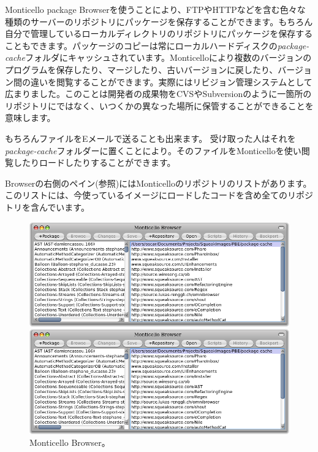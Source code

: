 \documentclass[a4paper,10pt,twoside]{book}
\begin{document}
Monticello package Browserを使うことにより、FTPやHTTPなどを含む色々な種類のサーバーのリポジトリにパッケージを保存することができます。もちろん自分で管理しているローカルディレクトリのリポジトリにパッケージを保存することもできます。パッケージのコピーは常にローカルハードディスクの\emph{package-cache}フォルダにキャッシュされています。Monticelloにより複数のバージョンのプログラムを保存したり、マージしたり、古いバージョンに戻したり、バージョン間の違いを閲覧することができます。実際にはリビジョン管理システムとして広まりました。このことは開発者の成果物をCVSやSubversionのように一箇所のリポジトリにではなく、いつくかの異なった場所に保管することができることを意味します。

もちろんファイルをEメールで送ることも出来ます。
受け取った人はそれを\emph{package-cache}フォルダーに置くことにより。そのファイルをMonticelloを使い閲覧したりロードしたりすることができます。

Browserの右側のペイン(参照)にはMonticelloのリポジトリのリストがあります。このリストには、今使っているイメージにロードしたコードを含め全てのリポジトリを含んでいます。


\begin{figure}[hbt]
\ifluluelse
	{\centerline {\includegraphics[width=\textwidth]{MonticelloBrowser}}}
	{\centerline {\includegraphics[scale=0.7]{MonticelloBrowser}}}
\caption{Monticello Browser。
}
\end{figure}
\end{document}
